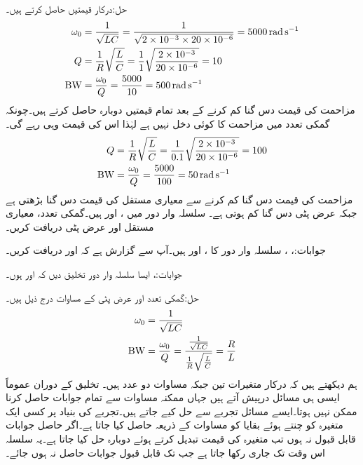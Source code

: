 حل:درکار قیمتیں حاصل کرتے ہیں۔
\begin{align*}
\omega_0&=\frac{1}{\sqrt{LC}}=\frac{1}{\sqrt{2\times 10^{-3}\times 20\times 10^{-6}}}=\SI{5000}{\radian\per\second}\\
Q&=\frac{1}{R}\sqrt{\frac{L}{C}}=\frac{1}{1}\sqrt{\frac{2\times 10^{-3}}{20\times 10^{-6}}}=10\\
{{\textup{BW}}}&=\frac{\omega_0}{Q}=\frac{5000}{10}=\SI{500}{\radian\per\second}
\end{align*}
مزاحمت کی قیمت دس گنا کم کرنے کے بعد تمام قیمتیں دوبارہ حاصل کرتے ہیں۔چونکہ گمکی تعدد میں مزاحمت کا کوئی دخل نہیں ہے لہٰذا اس کی قیمت وہی رہے گی۔
\begin{align*}
Q&=\frac{1}{R}\sqrt{\frac{L}{C}}=\frac{1}{0.1}\sqrt{\frac{2\times 10^{-3}}{20\times 10^{-6}}}=100\\
{{\textup{BW}}}&=\frac{\omega_0}{Q}=\frac{5000}{100}=\SI{50}{\radian\per\second}
\end{align*}
مزاحمت کی قیمت دس گنا کم کرنے سے معیاری مستقل کی قیمت دس گنا بڑھتی ہے جبکہ عرض پٹی دس گنا کم ہوتی ہے۔
سلسلہ وار  دور میں ،  اور  ہیں۔گمکی تعدد، معیاری مستقل اور عرض پٹی دریافت کریں۔

جوابات:، ، 
سلسلہ وار  دور کا ،  اور  ہیں۔آپ سے گزارش ہے کہ  اور  دریافت کریں۔

جوابات:، 
ایسا سلسلہ وار  دور تخلیق دیں کہ  اور  ہوں۔

حل:گمکی تعدد اور عرض پٹی کے مساوات درج ذیل ہیں۔
\begin{align*}
\omega_0&=\frac{1}{\sqrt{LC}}\\
{{\textup{BW}}}&=\frac{\omega_0}{Q}=\frac{\frac{1}{\sqrt{LC}}}{\frac{1}{R}\sqrt{\frac{L}{C}}}=\frac{R}{L}
\end{align*}
ہم دیکھتے ہیں کہ درکار متغیرات تین جبکہ مساوات دو عدد ہیں۔ تخلیق کے دوران عموماً ایسی ہی مسائل درپیش آتے ہیں جہاں ممکنہ مساوات سے تمام جوابات حاصل کرنا ممکن نہیں ہوتا۔ایسے مسائل تجربے سے حل کیے جاتے ہیں۔تجربے کی بنیاد پر کسی ایک متغیرہ کو چنتے ہوئے بقایا کو مساوات کے ذریعہ حاصل کیا جاتا ہے۔اگر حاصل جوابات قابل قبول نہ ہوں تب متغیرہ کی قیمت تبدیل کرتے ہوئے دوبارہ حل کیا جاتا ہے۔یہ سلسلہ اس وقت تک جاری رکھا جاتا ہے جب تک قابل قبول جوابات حاصل نہ ہوں جائے۔

